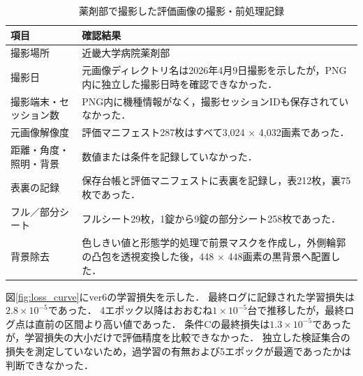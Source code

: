 \documentclass[uplatex,dvipdfmx]{jsarticle}
\begin{document}
\begin{table}[H]
  \centering
  \caption{薬剤部で撮影した評価画像の撮影・前処理記録}
  \label{tab:capture_conditions}
  \small
  \begin{tabular}{|p{4.0cm}|p{8.2cm}|}
    \hline
    項目 & 確認結果 \\ \hline
    撮影場所 & 近畿大学病院薬剤部 \\ \hline
    撮影日 & 元画像ディレクトリ名は2026年4月9日撮影を示したが，PNG内に独立した撮影日時を確認できなかった． \\ \hline
    撮影端末・セッション数 & PNG内に機種情報がなく，撮影セッションIDも保存されていなかった． \\ \hline
    元画像解像度 & 評価マニフェスト287枚はすべて3,024 $\times$ 4,032画素であった． \\ \hline
    距離・角度・照明・背景 & 数値または条件を記録していなかった． \\ \hline
    表裏の記録 & 保存台帳と評価マニフェストに表裏を記録し，表212枚，裏75枚であった． \\ \hline
    フル／部分シート & フルシート29枚，1錠から9錠の部分シート258枚であった． \\ \hline
    背景除去 & 色しきい値と形態学的処理で前景マスクを作成し，外側輪郭の凸包を透視変換した後，448 $\times$ 448画素の黒背景へ配置した． \\ \hline
  \end{tabular}
\end{table}

図\ref{fig:loss_curve}にver6の学習損失を示した．
最終ログに記録された学習損失は$2.8 \times 10^{-5}$であった．
4エポック以降はおおむね$1 \times 10^{-5}$台で推移したが，最終ログ点は直前の区間より高い値であった．
条件Cの最終損失は$1.3 \times 10^{-5}$であったが，学習損失の大小だけで評価精度を比較できなかった．
独立した検証集合の損失を測定していないため，過学習の有無および5エポックが最適であったかは判断できなかった．
\end{document}
